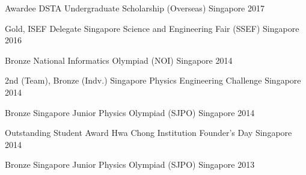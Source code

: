 
\begin{cvhonors}


\cvhonor
{Awardee} %
{DSTA Undergraduate Scholarship (Overseas)} %
{Singapore} %
{2017} %


\cvhonor
{Gold, ISEF Delegate} %
{Singapore Science and Engineering Fair (SSEF)} %
{Singapore} %
{2016} %


\cvhonor
{Bronze} %
{National Informatics Olympiad (NOI)} %
{Singapore} %
{2014} %


\cvhonor
{2nd (Team), Bronze (Indv.)} %
{Singapore Physics Engineering Challenge} %
{Singapore} %
{2014} %


\cvhonor
{Bronze} %
{Singapore Junior Physics Olympiad (SJPO)} %
{Singapore} %
{2014} %


\cvhonor
{Outstanding Student Award} %
{Hwa Chong Institution Founder's Day} %
{Singapore} %
{2014} %



\cvhonor
{Bronze} %
{Singapore Junior Physics Olympiad (SJPO)} %
{Singapore} %
{2013} %


\end{cvhonors}